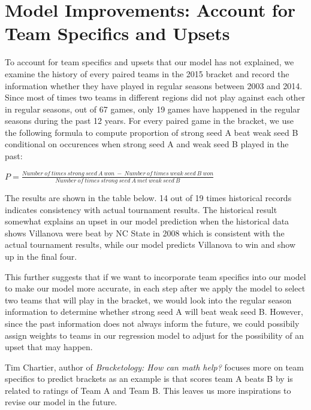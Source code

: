 \documentclass{article} %
\begin{document}
\section{Model Improvements: Account for Team Specifics and Upsets}

To account for team specifics and upsets that our model has not explained, we examine the history of every paired teams in the 2015 bracket and record the information whether they have played in regular seasons between 2003 and 2014. Since most of times two teams in different regions did not play against each other in regular seasons, out of 67 games, only 19 games have happened in the regular seasons during the past 12 years. For every paired game in the bracket, we use the following formula to compute proportion of strong seed A beat weak seed B conditional on occurences when strong seed A and weak seed B played in the past:

$P=\frac{Number \ of \ times \ strong \ seed \ A \ won \ - \ Number \ of \ times \ weak \ seed \ B \ won}{Number \ of \ times \ strong \ seed \ A \ met \ weak \ seed \ B }$


The results are shown in the table below. 14 out of 19 times historical records indicates consistency with actual tournament results. The historical result somewhat explains an upset in our model prediction when the historical data shows Villanova were beat by NC State in 2008 which is consistent with the actual tournament results, while our model predicts Villanova to win and show up in the final four. 

This further suggests that if we want to incorporate team specifics into our model to make our model more accurate, in each step after we apply the model to select two teams that will play in the bracket, we would look into the regular season information to determine whether strong seed A will beat weak seed B. However, since the past information does not always inform the future, we could possibily assign weights to teams in our regression model to adjust for the possibility of an upset that may happen. 

Tim Chartier, author of \textit{Bracketology: How can math help?} focuses more on team specifics to predict brackets as an example is that scores team A beats B by is related to ratings of Team A and Team B. This leaves us more inspirations to revise our model in the future. 
\end{document}
